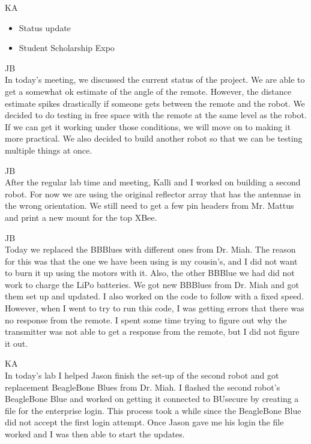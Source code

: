 \documentclass[fontsize=11pt, %
                             paper=letter, %
                             openany, %
                             captions=tableheading,
                             index=totoc,
                             hyperref]{labbook}
\begin{document}
\begin{addmargin}[0cm]{0cm}
KA\\
\begin{itemize}
    \item Status update
    \item Student Scholarship Expo
\end{itemize}

JB\\
In today's meeting, we discussed the current status of the project. We are able to get a somewhat ok estimate of the angle of the remote. However, the distance estimate spikes drastically if someone gets between the remote and the robot. We decided to do testing in free space with the remote at the same level as the robot. If we can get it working under those conditions, we will move on to making it more practical. We also decided to build another robot so that we can be testing multiple things at once.

JB\\
After the regular lab time and meeting, Kalli and I worked on building a second robot. For now we are using the original reflector array that has the antennae in the wrong orientation. We still need to get a few pin headers from Mr. Mattus and print a new mount for the top XBee.

JB\\
Today we replaced the BBBlues with different ones from Dr. Miah. The reason for this was that the one we have been using is my cousin's, and I did not want to burn it up using the motors with it. Also, the other BBBlue we had did not work to charge the LiPo batteries. We got new BBBlues from Dr. Miah and got them set up and updated. I also worked on the code to follow with a fixed speed. However, when I went to try to run this code, I was getting errors that there was no response from the remote. I spent some time trying to figure out why the transmitter was not able to get a response from the remote, but I did not figure it out.

\vspace*{12pt}
KA\\
In today's lab I helped Jason finish the set-up of the second robot and got replacement BeagleBone Blues from Dr. Miah. I flashed the second robot's BeagleBone Blue and worked on getting it connected to BUsecure by creating a file for the enterprise login. This process took a while since the BeagleBone Blue did not accept the first login attempt. Once Jason gave me his login the file worked and I was then able to start the updates.


\end{addmargin}
\end{document}
